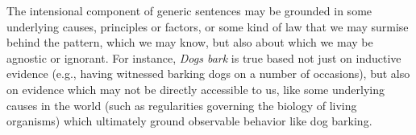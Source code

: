 \documentclass[output=paper,colorlinks,citecolor=brown]{langscibook}
\begin{document}

The intensional component of generic sentences may be grounded in some underlying causes, principles or factors, or some kind of law that we may surmise behind the pattern, which we may know, but also about which we may be agnostic or ignorant. For instance,
\textit{Dogs bark} is true based not just on inductive evidence (e.g., having witnessed barking dogs on a number of occasions), but also on evidence which may not be directly accessible to us, like some underlying causes in the world (such as regularities governing the biology of living organisms) which ultimately ground observable behavior like dog barking. 
\end{document}
